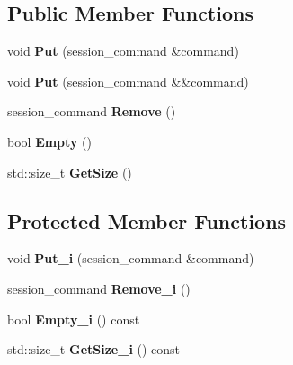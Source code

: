 \subsection*{Public Member Functions}
\begin{DoxyCompactItemize}
\item 
\hypertarget{classengine_1_1cCommandQueue_a8d4177c05ac9c763d526c050d501df08}{void {\bfseries Put} (session\-\_\-command \&command)}\label{classengine_1_1cCommandQueue_a8d4177c05ac9c763d526c050d501df08}

\item 
\hypertarget{classengine_1_1cCommandQueue_a70a078f46f2e5c0e27db2de65d67d797}{void {\bfseries Put} (session\-\_\-command \&\&command)}\label{classengine_1_1cCommandQueue_a70a078f46f2e5c0e27db2de65d67d797}

\item 
\hypertarget{classengine_1_1cCommandQueue_abd8ffcd2a0dc1795a5157d11f0883e5c}{session\-\_\-command {\bfseries Remove} ()}\label{classengine_1_1cCommandQueue_abd8ffcd2a0dc1795a5157d11f0883e5c}

\item 
\hypertarget{classengine_1_1cCommandQueue_a727d36f68de37caba84869e3f973ccbc}{bool {\bfseries Empty} ()}\label{classengine_1_1cCommandQueue_a727d36f68de37caba84869e3f973ccbc}

\item 
\hypertarget{classengine_1_1cCommandQueue_af6b95fb876418671d6285ee368abca25}{std\-::size\-\_\-t {\bfseries Get\-Size} ()}\label{classengine_1_1cCommandQueue_af6b95fb876418671d6285ee368abca25}

\end{DoxyCompactItemize}
\subsection*{Protected Member Functions}
\begin{DoxyCompactItemize}
\item 
\hypertarget{classengine_1_1cCommandQueue_a21549c27cc7a5833a7a0cae02fdc3bc8}{void {\bfseries Put\-\_\-i} (session\-\_\-command \&command)}\label{classengine_1_1cCommandQueue_a21549c27cc7a5833a7a0cae02fdc3bc8}

\item 
\hypertarget{classengine_1_1cCommandQueue_afb802d8459ac29daf1c11c0274650fc4}{session\-\_\-command {\bfseries Remove\-\_\-i} ()}\label{classengine_1_1cCommandQueue_afb802d8459ac29daf1c11c0274650fc4}

\item 
\hypertarget{classengine_1_1cCommandQueue_a7c8a6bd8dae5c050634cededcb77ef4d}{bool {\bfseries Empty\-\_\-i} () const }\label{classengine_1_1cCommandQueue_a7c8a6bd8dae5c050634cededcb77ef4d}

\item 
\hypertarget{classengine_1_1cCommandQueue_a2b729f6d9866c6e9b50e142f7e475b05}{std\-::size\-\_\-t {\bfseries Get\-Size\-\_\-i} () const }\label{classengine_1_1cCommandQueue_a2b729f6d9866c6e9b50e142f7e475b05}

\end{DoxyCompactItemize}
